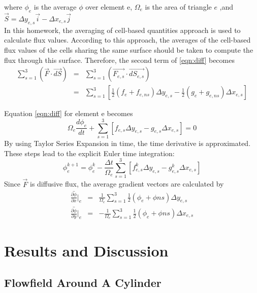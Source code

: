 \documentclass[letterpaper,12pt]{article}
\begin{document}
where $\phi_e$ is the average $\phi$ over element e, $\Omega_e$ is the area of triangle $e$ ,and
$\vec{S} = \Delta y_{e,s}\vec{i}-\Delta x_{e,s}\vec{j}$\\
In this homework, the averaging of cell-based quantities approach is used to calculate flux values. According to this approach,
the averages of the cell-based flux values of the cells sharing the same surface should be taken to compute the flux
through this surface. Therefore, the second term of \ref{eqn:diff} becomes
\begin{eqnarray}
	\sum_{s=1}^{3} (\vec{F} \cdot \vec{dS})&=&\sum_{s=1}^{3} (\vec{F_{e,s}} \cdot \vec{dS_{e,s}}) \nonumber \\
	&=&\sum_{s=1}^{3}[\frac{1}{2}(f_{e}+f_{e,ns})\Delta y_{e,s}-\frac{1}{2}(g_{e}+g_{e,ns})\Delta x_{e,s}] 
\end{eqnarray}

Equation \ref{eqn:diff} for element e becomes
\begin{equation}
        \Omega_e \frac{d\phi_e}{dt} +\sum_{s=1}^{3} [f_{e,s}\Delta y_{e,s}-g_{e,s}\Delta x_{e,s}]=0
\end{equation}
By using Taylor Series Expansion in time, the time derivative is approximated. These steps lead to the explicit Euler time
integration:
\begin{equation}
        \phi_{e}^{k+1} =\phi_{e}^{k} - \frac{\Delta t}{\Omega_e}\sum_{s=1}^{3}[f_{e,s}^{k}\Delta y_{e,s}-g_{e,s}^{k}\Delta x_{e,s}]
\end{equation}
Since $\vec{F}$ is diffusive flux, the average gradient vectors are calculated by
\begin{eqnarray}
\bar{\frac{\partial \phi}{\partial x}}\bigg|_{e}&=&\frac{1}{\Omega_e}\sum_{s=1}^{3}\frac{1}{2}(\phi_e+\phi{ns})\Delta y_{e,s} \nonumber \\
\bar{\frac{\partial \phi}{\partial y}}\bigg|_{e}&=&-\frac{1}{\Omega_e}\sum_{s=1}^{3}\frac{1}{2}(\phi_e+\phi{ns})\Delta x_{e,s}	\nonumber
\end{eqnarray}
\newpage

\section{Results and Discussion}

\subsection{Flowfield Around A Cylinder}
\end{document}
